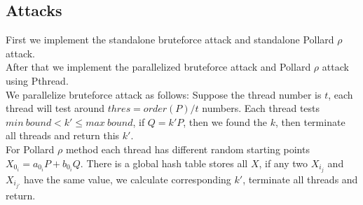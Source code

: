 \documentclass[10pt,a4paper]{article}
\begin{document}
\subsection{Attacks}
\indent First we implement the standalone bruteforce attack and standalone Pollard $\rho$ attack.\\
\indent After that we implement the parallelized bruteforce attack and Pollard $\rho$ attack using Pthread.\\
\indent We parallelize bruteforce attack as follows: Suppose the thread number is $t$, each thread will test around $thres = order(P) / t$ numbers. Each thread tests $min\ bound < k' \leqslant max\ bound$, if $Q = k'P$, then we found the $k$, then terminate all threads and return this $k'$.\\
\indent For Pollard $\rho$ method each thread has different random starting points $X_{0_i} = a_{0_i}P + b_{0_i}Q$. There is a global hash table stores all $X$, if any two $X_{i_j}$ and $X_{i_{j'}}$ have the same value, we calculate corresponding $k'$, terminate all threads and return. 
\end{document}
